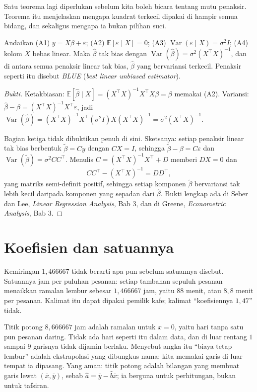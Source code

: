 Satu teorema lagi diperlukan sebelum kita boleh bicara tentang mutu penaksir. Teorema
itu menjelaskan mengapa kuadrat terkecil dipakai di hampir semua bidang, dan sekaligus
mengapa ia bukan pilihan suci.

\begin{teorema}
Andaikan (A1) $y=X\beta+\varepsilon$; (A2) $\mathbb{E}[\varepsilon\mid X]=0$;
(A3) $\operatorname{Var}(\varepsilon\mid X)=\sigma^2I$; (A4) kolom $X$ bebas linear.
Maka $\hat\beta$ tak bias dengan $\operatorname{Var}(\hat\beta)=\sigma^2(X^{\top}X)^{-1}$,
dan di antara semua penaksir linear tak bias, $\hat\beta$ yang bervariansi terkecil.
Penaksir seperti itu disebut \emph{BLUE} (\emph{best linear unbiased estimator}).
\end{teorema}

\begin{proof}[Bukti]
Ketakbiasan: $\mathbb{E}[\hat\beta\mid X]=(X^{\top}X)^{-1}X^{\top}X\beta=\beta$ memakai
(A2). Variansi: $\hat\beta-\beta=(X^{\top}X)^{-1}X^{\top}\varepsilon$, jadi
$\operatorname{Var}(\hat\beta)=(X^{\top}X)^{-1}X^{\top}(\sigma^2I)X(X^{\top}X)^{-1}
=\sigma^2(X^{\top}X)^{-1}$.

Bagian ketiga tidak dibuktikan penuh di sini. Sketsanya: setiap penaksir linear tak
bias berbentuk $\tilde\beta=Cy$ dengan $CX=I$, sehingga $\tilde\beta-\beta=C\varepsilon$
dan $\operatorname{Var}(\tilde\beta)=\sigma^2CC^{\top}$. Menulis $C=(X^{\top}X)^{-1}X^{\top}+D$
memberi $DX=0$ dan
\[
CC^{\top}-(X^{\top}X)^{-1}=DD^{\top},
\]
yang matriks semi-definit positif, sehingga setiap komponen $\tilde\beta$ bervariansi
tak lebih kecil daripada komponen yang sepadan dari $\hat\beta$. Bukti lengkap ada di
Seber dan Lee, \emph{Linear Regression Analysis}, Bab 3, dan di Greene,
\emph{Econometric Analysis}, Bab 3.
\end{proof}

\section{Koefisien dan satuannya}

Kemiringan $1{,}466667$ tidak berarti apa pun sebelum satuannya disebut. Satuannya jam
per puluhan pesanan: setiap tambahan sepuluh pesanan menaikkan ramalan lembur sebesar
$1{,}466667$ jam, yaitu $88$ menit, atau $8{,}8$ menit per pesanan. Kalimat itu dapat
dipakai pemilik kafe; kalimat ``koefisiennya $1{,}47$'' tidak.

Titik potong $8{,}666667$ jam adalah ramalan untuk $x=0$, yaitu hari tanpa satu pun
pesanan daring. Tidak ada hari seperti itu dalam data, dan di luar rentang $1$ sampai
$9$ garisnya tidak dijamin berlaku. Menyebut angka itu ``biaya tetap lembur'' adalah
ekstrapolasi yang dibungkus nama: kita memakai garis di luar
tempat ia dipasang. Yang aman: titik potong adalah bilangan yang membuat garis lewat
$(\bar x,\bar y)$, sebab $\hat a=\bar y-\hat b\bar x$; ia berguna untuk perhitungan,
bukan untuk tafsiran.


